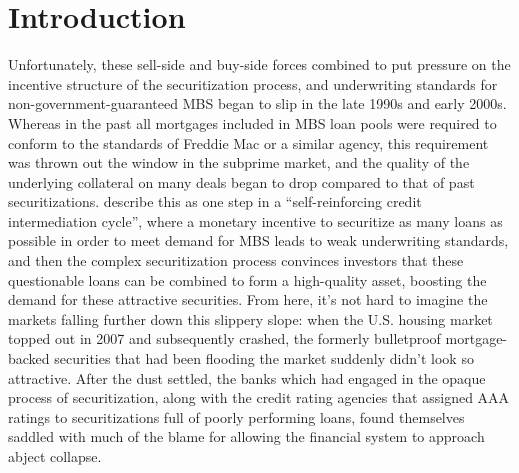\documentclass[12pt]{article}
\begin{document}
\section*{Introduction}
Unfortunately, these sell-side and buy-side forces combined to put pressure on the incentive structure of the securitization process, and underwriting standards for non-government-guaranteed MBS began to slip in the late 1990s and early 2000s. Whereas in the past all mortgages included in MBS loan pools were required to conform to the standards of Freddie Mac or a similar agency, this requirement was thrown out the window in the subprime market, and the quality of the underlying collateral on many deals began to drop compared to that of past securitizations. \textcite{segoviano13} describe this as one step in a “self-reinforcing credit intermediation cycle”, where a monetary incentive to securitize as many loans as possible in order to meet demand for MBS leads to weak underwriting standards, and then the complex securitization process convinces investors that these questionable loans can be combined to form a high-quality asset, boosting the demand for these attractive securities. From here, it’s not hard to imagine the markets falling further down this slippery slope: when the U.S. housing market topped out in 2007 and subsequently crashed, the formerly bulletproof mortgage-backed securities that had been flooding the market suddenly didn’t look so attractive. After the dust settled, the banks which had engaged in the opaque process of securitization, along with the credit rating agencies that assigned AAA ratings to securitizations full of poorly performing loans, found themselves saddled with much of the blame for allowing the financial system to approach abject collapse.
\end{document}
